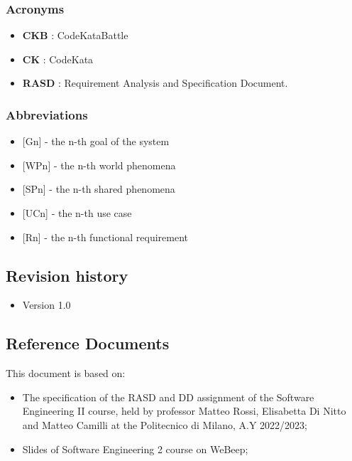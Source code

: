 \subsubsection{Acronyms}
\begin{itemize}
    \setlength{\itemsep}{0pt}
    \setlength{\parskip}{0pt}
    \setlength{\parsep}{0pt}
    \setlength{\partopsep}{0pt}
    \setlength{\topsep}{0pt}
    \item \textbf{CKB} : CodeKataBattle
    \item \textbf{CK} : CodeKata
    \item \textbf{RASD} : Requirement Analysis and Specification Document.
\end{itemize}


\vspace{0.5\baselineskip}
\subsubsection{Abbreviations}

\begin{itemize}
    \setlength{\itemsep}{0pt}
    \setlength{\parskip}{0pt}
    \setlength{\parsep}{0pt}
    \setlength{\partopsep}{0pt}
    \setlength{\topsep}{0pt}
    \item {[Gn]} - the n-th goal of the system
    \item {[WPn]} - the n-th world phenomena
    \item {[SPn]} - the n-th shared phenomena
    \item {[UCn]} - the n-th use case
    \item {[Rn]} - the n-th functional requirement
\end{itemize}


\vspace{1\baselineskip}
\subsection{Revision history}
\begin{itemize}
    \item Version 1.0
\end{itemize}


\vspace{1\baselineskip}
\subsection{Reference Documents}
This document is based on:
\begin{itemize}
    \item The specification of the RASD and DD assignment of the Software
Engineering II course, held by professor Matteo Rossi, Elisabetta Di Nitto and
Matteo Camilli at the Politecnico di Milano, A.Y 2022/2023;
    \item Slides of Software Engineering 2 course on WeBeep;
\end{itemize}

